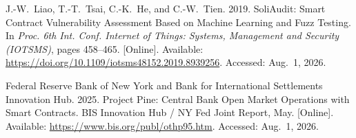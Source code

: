 \documentclass[12pt,a4paper]{report}
\begin{document}
{\begin{enumerate}[label={[\arabic*]}]
\item J.-W.~Liao, T.-T.~Tsai, C.-K.~He, and C.-W.~Tien. 2019. SoliAudit: Smart Contract Vulnerability Assessment Based on Machine Learning and Fuzz Testing. In \emph{Proc. 6th Int. Conf. Internet of Things: Systems, Management and Security (IOTSMS)}, pages 458--465. [Online]. Available: \url{https://doi.org/10.1109/iotsms48152.2019.8939256}. Accessed: Aug.~1, 2026.

\item Federal Reserve Bank of New York and Bank for International Settlements Innovation Hub. 2025. Project Pine: Central Bank Open Market Operations with Smart Contracts. BIS Innovation Hub / NY Fed Joint Report, May. [Online]. Available: \url{https://www.bis.org/publ/othp95.htm}. Accessed: Aug.~1, 2026.

\end{enumerate}
}
\end{document}
